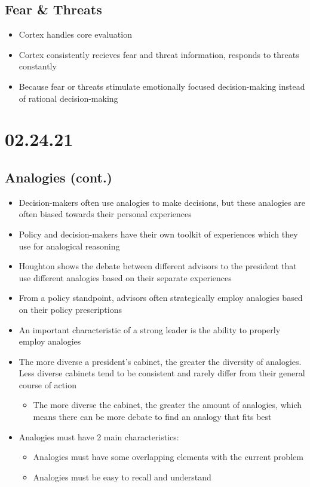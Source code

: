 \documentclass[11pt]{article}
\begin{document}
\subsection*{Fear \& Threats}
\label{sec:org889b58e}
\begin{itemize}
\item Cortex handles core evaluation
\item Cortex consistently recieves fear and threat information, responds to threats constantly
\item Because fear or threats stimulate emotionally focused decision-making instead of rational decision-making
\end{itemize}
\section*{02.24.21}
\label{sec:org5835f73}
\subsection*{Analogies (cont.)}
\label{sec:org30a0ae1}
\begin{itemize}
\item Decision-makers often use analogies to make decisions, but these analogies are often biased towards their personal experiences
\item Policy and decision-makers have their own toolkit of experiences which they use for analogical reasoning
\item Houghton shows the debate between different advisors to the president that use different analogies based on their separate experiences
\item From a policy standpoint, advisors often strategically employ analogies based on their policy prescriptions
\item An important characteristic of a strong leader is the ability to properly employ analogies
\item The more diverse a president's cabinet, the greater the diversity of analogies. Less diverse cabinets tend to be consistent and rarely differ from their general course of action
\begin{itemize}
\item The more diverse the cabinet, the greater the amount of analogies, which means there can be more debate to find an analogy that fits best
\end{itemize}
\item Analogies must have 2 main characteristics:
\begin{itemize}
\item Analogies must have some overlapping elements with the current problem
\item Analogies must be easy to recall and understand
\end{itemize}
\end{itemize}
\end{document}
